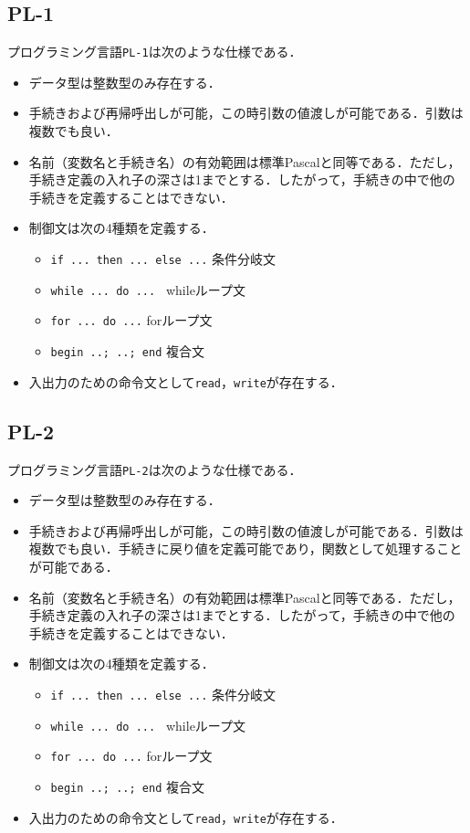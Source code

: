 \documentclass[uplatex]{jsarticle}
\begin{document}
\subsection{PL-1}
プログラミング言語\verb#PL-1#は次のような仕様である．
\begin{itemize}
  \item データ型は整数型のみ存在する．
  \item 手続きおよび再帰呼出しが可能，この時引数の値渡しが可能である．引数は複数でも良い．
  \item 名前（変数名と手続き名）の有効範囲は標準Pascalと同等である．ただし，手続き定義の入れ子の深さは1までとする．したがって，手続きの中で他の手続きを定義することはできない．
  \item 制御文は次の4種類を定義する．
  \begin{itemize}
    \item \verb#if ... then ... else ...# 条件分岐文
    \item \verb#while ... do ... # whileループ文
    \item \verb#for ... do ...# forループ文
    \item \verb#begin ..; ..; end# 複合文
  \end{itemize}
  \item 入出力のための命令文として\verb#read#，\verb#write#が存在する．
\end{itemize}
\subsection{PL-2}
プログラミング言語\verb#PL-2#は次のような仕様である．
\begin{itemize}
  \item データ型は整数型のみ存在する．
  \item 手続きおよび再帰呼出しが可能，この時引数の値渡しが可能である．引数は複数でも良い．手続きに戻り値を定義可能であり，関数として処理することが可能である．
  \item 名前（変数名と手続き名）の有効範囲は標準Pascalと同等である．ただし，手続き定義の入れ子の深さは1までとする．したがって，手続きの中で他の手続きを定義することはできない．
  \item 制御文は次の4種類を定義する．
  \begin{itemize}
    \item \verb#if ... then ... else ...# 条件分岐文
    \item \verb#while ... do ... # whileループ文
    \item \verb#for ... do ...# forループ文
    \item \verb#begin ..; ..; end# 複合文
  \end{itemize}
  \item 入出力のための命令文として\verb#read#，\verb#write#が存在する．
\end{itemize}
\end{document}
